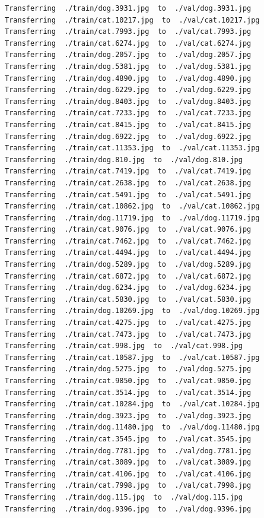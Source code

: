 \documentclass[]{book}
\theoremstyle{definition}
\theoremstyle{definition}
\theoremstyle{definition}
\theoremstyle{remark}
\begin{document}
\begin{verbatim}
Transferring  ./train/dog.3931.jpg  to  ./val/dog.3931.jpg
Transferring  ./train/cat.10217.jpg  to  ./val/cat.10217.jpg
Transferring  ./train/cat.7993.jpg  to  ./val/cat.7993.jpg
Transferring  ./train/cat.6274.jpg  to  ./val/cat.6274.jpg
Transferring  ./train/dog.2057.jpg  to  ./val/dog.2057.jpg
Transferring  ./train/dog.5381.jpg  to  ./val/dog.5381.jpg
Transferring  ./train/dog.4890.jpg  to  ./val/dog.4890.jpg
Transferring  ./train/dog.6229.jpg  to  ./val/dog.6229.jpg
Transferring  ./train/dog.8403.jpg  to  ./val/dog.8403.jpg
Transferring  ./train/cat.7233.jpg  to  ./val/cat.7233.jpg
Transferring  ./train/cat.8415.jpg  to  ./val/cat.8415.jpg
Transferring  ./train/dog.6922.jpg  to  ./val/dog.6922.jpg
Transferring  ./train/cat.11353.jpg  to  ./val/cat.11353.jpg
Transferring  ./train/dog.810.jpg  to  ./val/dog.810.jpg
Transferring  ./train/cat.7419.jpg  to  ./val/cat.7419.jpg
Transferring  ./train/cat.2638.jpg  to  ./val/cat.2638.jpg
Transferring  ./train/cat.5491.jpg  to  ./val/cat.5491.jpg
Transferring  ./train/cat.10862.jpg  to  ./val/cat.10862.jpg
Transferring  ./train/dog.11719.jpg  to  ./val/dog.11719.jpg
Transferring  ./train/cat.9076.jpg  to  ./val/cat.9076.jpg
Transferring  ./train/cat.7462.jpg  to  ./val/cat.7462.jpg
Transferring  ./train/cat.4494.jpg  to  ./val/cat.4494.jpg
Transferring  ./train/dog.5289.jpg  to  ./val/dog.5289.jpg
Transferring  ./train/cat.6872.jpg  to  ./val/cat.6872.jpg
Transferring  ./train/dog.6234.jpg  to  ./val/dog.6234.jpg
Transferring  ./train/cat.5830.jpg  to  ./val/cat.5830.jpg
Transferring  ./train/dog.10269.jpg  to  ./val/dog.10269.jpg
Transferring  ./train/cat.4275.jpg  to  ./val/cat.4275.jpg
Transferring  ./train/cat.7473.jpg  to  ./val/cat.7473.jpg
Transferring  ./train/cat.998.jpg  to  ./val/cat.998.jpg
Transferring  ./train/cat.10587.jpg  to  ./val/cat.10587.jpg
Transferring  ./train/dog.5275.jpg  to  ./val/dog.5275.jpg
Transferring  ./train/cat.9850.jpg  to  ./val/cat.9850.jpg
Transferring  ./train/cat.3514.jpg  to  ./val/cat.3514.jpg
Transferring  ./train/cat.10284.jpg  to  ./val/cat.10284.jpg
Transferring  ./train/dog.3923.jpg  to  ./val/dog.3923.jpg
Transferring  ./train/dog.11480.jpg  to  ./val/dog.11480.jpg
Transferring  ./train/cat.3545.jpg  to  ./val/cat.3545.jpg
Transferring  ./train/dog.7781.jpg  to  ./val/dog.7781.jpg
Transferring  ./train/cat.3089.jpg  to  ./val/cat.3089.jpg
Transferring  ./train/cat.4106.jpg  to  ./val/cat.4106.jpg
Transferring  ./train/cat.7998.jpg  to  ./val/cat.7998.jpg
Transferring  ./train/dog.115.jpg  to  ./val/dog.115.jpg
Transferring  ./train/dog.9396.jpg  to  ./val/dog.9396.jpg

\end{verbatim}
\end{document}
